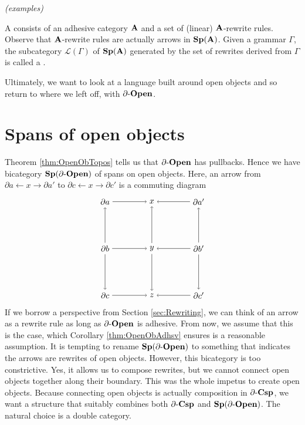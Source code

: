 \documentclass{amsart}
\begin{document}
{\color{red}\emph{(examples)}}

\begin{df} \label{df:GrmrLang}
	A  consists of an adhesive category $ \mathbf{A} $ and a set of (linear) $ \mathbf{A} $-rewrite rules.  Observe that $ \mathbf{A} $-rewrite rules are actually arrows in $ \mathbf{Sp}(\mathbf{A}) $.  Given a grammar $ \Gamma $, the subcategory $ \mathcal{L} ( \Gamma ) $ of $ \mathbf{Sp}( \mathbf{A} ) $ generated by the set of rewrites derived from $ \Gamma $ is called a .  
\end{df}

Ultimately, we want to look at a language built around open objects and so return to where we left off, with $ \partial \text{-} \mathbf{Open} $.

\section{Spans of open objects}
\label{sec:SpansOpnObs}

Theorem \ref{thm:OpenObTopos} tells us that $ \partial \text{-} \mathbf{Open} $ has pullbacks.  Hence we have bicategory $ \mathbf{Sp}(\partial \text{-} \mathbf{Open}) $ of spans on open objects.  Here, an arrow from $ \partial a \gets x \to \partial a' $ to $ \partial c \gets x \to \partial c' $ is a commuting diagram
\[
\begin{tikzpicture}
	\node (a) at (-1,1) {$ \partial a $};
	\node (x) at (1,1) {$ x $};
	\node (a') at (3,1) {$ \partial a' $};
	\node (b) at (-1,-1) {$ \partial b $};
	\node (y) at (1,-1) {$ y $};
	\node (b') at (3,-1) {$ \partial b' $};
	\node (c) at (-1,-3) {$ \partial c $};
	\node (z) at (1,-3) {$ z $};
	\node (c') at (3,-3) {$ \partial c' $};
	\draw [->] (a) to (x);
	\draw [->] (a') to (x);
	\draw [->] (b) to (y);
	\draw [->] (b') to (y);
	\draw [->] (c) to (z);
	\draw [->] (c') to (z);
	\draw [->] (b) to (a);
	\draw [->] (b) to (c);
	\draw [->] (y) to (x);
	\draw [->] (y) to (z);
	\draw [->] (b') to (a');
	\draw [->] (b') to (c');
\end{tikzpicture}
\]
If we borrow a perspective from Section \ref{sec:Rewriting}, we can think of an arrow as a rewrite rule as long as $ \partial \text{-} \mathbf{Open} $ is adhesive. From now, we assume that this is the case, which Corollary \ref{thm:OpenObAdhsv} ensures is a reasonable assumption.  It is tempting to rename $ \mathbf{Sp}(\partial \text{-} \mathbf{Open}) $ to something that indicates the arrows are rewrites of open objects.  However, this bicategory is too constrictive.  Yes, it allows us to compose rewrites, but we cannot connect open objects together along their boundary. This was the whole impetus to create open objects.  Because connecting open objects is actually composition in $ \partial \text{-} \mathbf{Csp} $, we want a structure that suitably combines both $ \partial \text{-} \mathbf{Csp} $ and $ \mathbf{Sp}(\partial \text{-} \mathbf{Open}) $.  The natural choice is a double category.  
\end{document}
